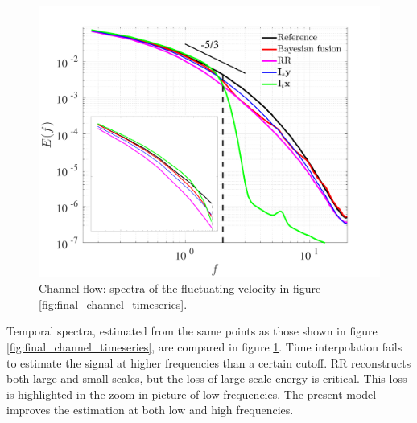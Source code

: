 \begin{figure}
\begin{center}
\includegraphics[width=0.8\columnwidth]{./images/comparisons/channel/improper_sspacing_10_tspacing_10_spectrum_time_joint.png}
\caption{\label{fig:final_channel_spectra} Channel flow: spectra of the fluctuating velocity in figure \ref{fig:final_channel_timeseries}.}
\end{center}
\end{figure}

Temporal spectra, estimated from the same points as those shown in figure \ref{fig:final_channel_timeseries}, are compared in figure \ref{fig:final_channel_spectra}. Time interpolation fails to estimate the signal at higher frequencies than a certain cutoff. RR reconstructs both large and small scales, but the loss of large scale energy is critical. This loss is highlighted in the zoom-in picture of low frequencies. The present model improves the estimation at both low and high frequencies.

